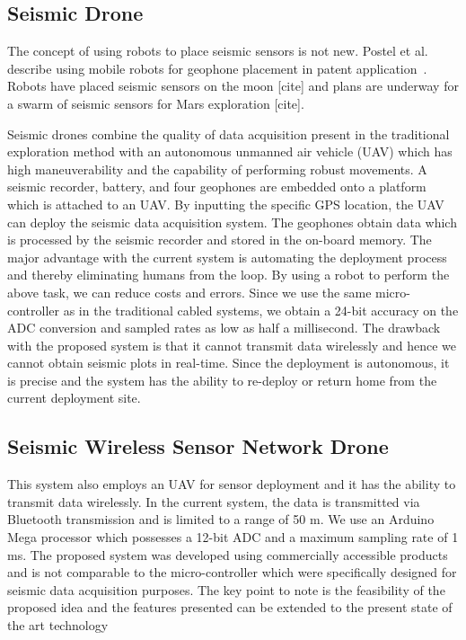 \subsection{Seismic Drone}  

The concept of using robots to place seismic sensors is not new.  Postel et al. describe using mobile robots for geophone placement in patent application~\cite{DSSMaA14}.  Robots have placed seismic sensors on the moon [cite] and plans are underway for a swarm of seismic sensors for Mars exploration [cite].



Seismic drones combine the quality of data acquisition present in the traditional exploration method with an autonomous unmanned air vehicle (UAV) which has high maneuverability and the capability of performing robust movements. A seismic recorder, battery, and four geophones are embedded onto a platform which is attached to an UAV. By inputting the specific GPS location, the UAV can deploy the seismic data acquisition system. The geophones obtain data which is processed by the seismic recorder and stored in the on-board memory. The major advantage with the current system is automating the deployment process and thereby eliminating humans from the loop. By using a robot to perform the above task, we can reduce costs and errors. Since we use the same micro-controller as in the traditional cabled systems, we obtain a 24-bit accuracy on the ADC conversion and sampled rates as low as half a millisecond. The drawback with the proposed system is that it cannot transmit data wirelessly and hence we cannot obtain seismic plots in real-time. Since the deployment is autonomous, it is precise and the system has the ability to re-deploy or return home from the current deployment site. 
 
\subsection{Seismic Wireless Sensor Network Drone}
   
   This system also employs an UAV for sensor deployment and it has the ability to transmit data wirelessly. In the current system, the data is transmitted via Bluetooth transmission and is limited to a range of 50 m. We use an Arduino Mega processor which possesses a 12-bit ADC and a maximum sampling rate of 1 ms. The proposed system was developed using commercially accessible products and is not comparable to the micro-controller which were specifically designed for seismic data acquisition purposes. The key point to note is the feasibility of the proposed idea and the features presented can be extended to the present state of the art technology